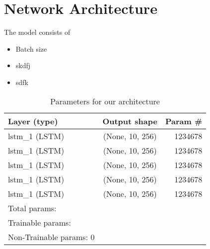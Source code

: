 \section{Network Architecture}

The model consists of

\begin{itemize}
    \item Batch size 
    \item skdfj
    \item sdfk
\end{itemize}

\begin{table}[h]
    \centering
    \begin{tabular}{ l c r }
      \hline
      Layer (type) & Output shape & Param \# \\ \hline
      lstm\_1 (LSTM) & (None, 10, 256) & 1234678 \\ \hline
      lstm\_1 (LSTM) & (None, 10, 256) & 1234678 \\ \hline
      lstm\_1 (LSTM) & (None, 10, 256) & 1234678 \\ \hline
      lstm\_1 (LSTM) & (None, 10, 256) & 1234678 \\ \hline
      lstm\_1 (LSTM) & (None, 10, 256) & 1234678 \\ \hline
      Total params: & & \\
      Trainable params: & & \\ 
      Non-Trainable params: 0 & & \\ \hline
      
    \end{tabular}
    \caption{Parameters for our architecture}
    \label{tab:archparams}
\end{table}
